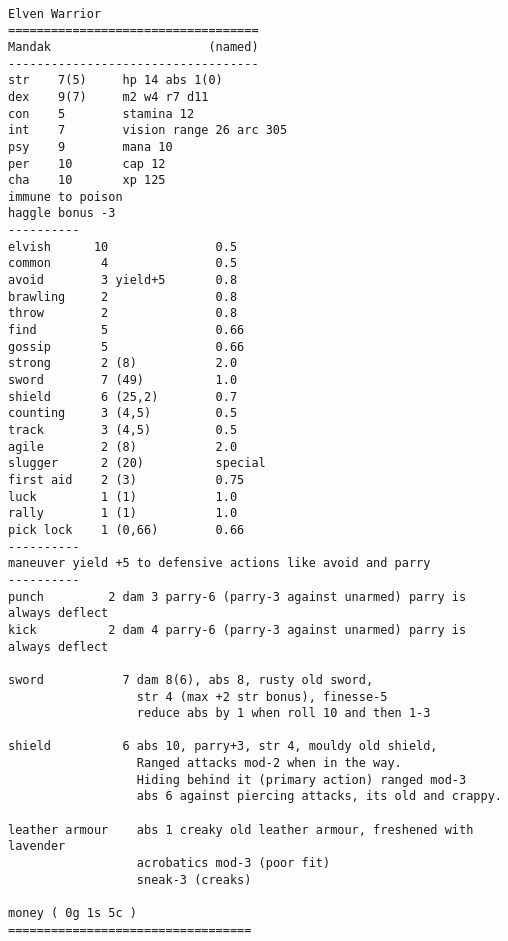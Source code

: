 \

\pagebreak[1]
\tiny \begin{samepage} \begin{verbatim}
Elven Warrior
===================================
Mandak                      (named)
-----------------------------------
str    7(5)     hp 14 abs 1(0)
dex    9(7)     m2 w4 r7 d11
con    5        stamina 12
int    7        vision range 26 arc 305
psy    9        mana 10
per    10       cap 12
cha    10       xp 125
immune to poison
haggle bonus -3
----------
elvish      10               0.5
common       4               0.5
avoid        3 yield+5       0.8
brawling     2               0.8
throw        2               0.8
find         5               0.66
gossip       5               0.66
strong       2 (8)           2.0
sword        7 (49)          1.0
shield       6 (25,2)        0.7
counting     3 (4,5)         0.5
track        3 (4,5)         0.5
agile        2 (8)           2.0
slugger      2 (20)          special
first aid    2 (3)           0.75
luck         1 (1)           1.0
rally        1 (1)           1.0
pick lock    1 (0,66)        0.66
----------
maneuver yield +5 to defensive actions like avoid and parry
----------
punch         2 dam 3 parry-6 (parry-3 against unarmed) parry is always deflect
kick          2 dam 4 parry-6 (parry-3 against unarmed) parry is always deflect

sword           7 dam 8(6), abs 8, rusty old sword,
                  str 4 (max +2 str bonus), finesse-5
                  reduce abs by 1 when roll 10 and then 1-3

shield          6 abs 10, parry+3, str 4, mouldy old shield,
                  Ranged attacks mod-2 when in the way.
                  Hiding behind it (primary action) ranged mod-3
                  abs 6 against piercing attacks, its old and crappy.

leather armour    abs 1 creaky old leather armour, freshened with lavender
                  acrobatics mod-3 (poor fit)
                  sneak-3 (creaks)

money ( 0g 1s 5c )
==================================
\end{verbatim} \end{samepage} \normalsize


\

